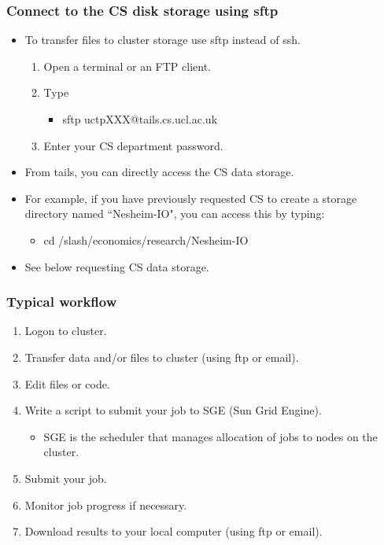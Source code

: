 \documentclass{beamer}
\begin{document}
\begin{frame}
\frametitle{Connect to the CS disk storage using sftp}
\begin{itemize}
\item To transfer files to cluster storage use sftp instead of ssh.
\begin{enumerate}
\item Open a terminal or an FTP client.
\item Type
\begin{itemize}
\item sftp uctpXXX@tails.cs.ucl.ac.uk
\end{itemize}
\item Enter your CS department password.
\end{enumerate}
\item From tails, you can directly access the CS data storage. 
\item For example, if you have previously  requested CS to 
create a storage directory named ``Nesheim-IO", you can access this by typing:
\begin{itemize}
\item cd /slash/economics/research/Nesheim-IO
\end{itemize}
\item See below requesting CS data storage.
\end{itemize}
\end{frame}

\begin{frame}
\frametitle{Typical workflow}
\begin{enumerate}
\item Logon to cluster.
\item Transfer data and/or files to cluster (using ftp or email).
\item Edit files or code.
\item Write a script to submit your job to SGE (Sun Grid Engine).
\begin{itemize}
\item SGE is the scheduler that manages allocation of jobs to nodes on the cluster.
\end{itemize}
\item Submit your job.
\item Monitor job progress if necessary. 
\item Download results to your local computer (using ftp or email).
\end{enumerate}

\end{frame}
\end{document}
